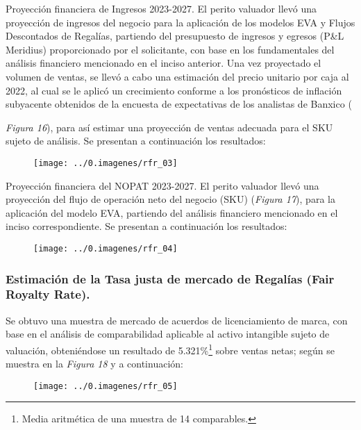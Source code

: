 \begin{leftcolumn}
\textcolor{principal}{Proyección financiera de Ingresos 2023-2027.} El perito valuador llevó  una proyección de ingresos del negocio para la aplicación de los modelos EVA y Flujos Descontados de Regalías, partiendo del presupuesto de ingresos y egresos (P\&L Meridius) proporcionado por el solicitante, con base en los fundamentales del análisis financiero mencionado en el inciso anterior. Una vez proyectado el volumen de ventas, se llevó a cabo una estimación del precio unitario por caja al 2022, al cual se le aplicó un crecimiento conforme a los pronósticos de inflación subyacente obtenidos de la encuesta de expectativas de los analistas de Banxico (\textcolor{principal}{\textit{Figura 16}), para así estimar una proyección de ventas adecuada para el SKU sujeto de análisis.  Se presentan a continuación los resultados:\\

\begin{figure}
\centering
\texttt{[image: ../0.imagenes/rfr\_03]}
\end{figure}

\textcolor{principal}{Proyección financiera del NOPAT 2023-2027.} El perito valuador llevó  una proyección del flujo de operación neto  del negocio (SKU) (\textcolor{principal}{\textit{Figura 17}}), para la aplicación del modelo EVA, partiendo del análisis financiero mencionado en el inciso correspondiente. Se presentan a continuación los resultados:\\

\begin{figure}
\centering
\texttt{[image: ../0.imagenes/rfr\_04]}
\end{figure}

\subsubsection{Estimación de la Tasa justa de mercado de Regalías (Fair Royalty Rate).}

Se obtuvo una muestra de mercado de acuerdos de licenciamiento de marca, con base en el análisis de comparabilidad aplicable al activo intangible sujeto de valuación, obteniéndose un resultado de \textcolor{principal}{5.321\%}\footnote{ Media aritmética de una muestra de 14 comparables.}  sobre \textcolor{principal}{ventas netas}; según se muestra en la \textcolor{principal}{\textit{Figura 18}} y a continuación:

\begin{figure}
\centering
\texttt{[image: ../0.imagenes/rfr\_05]}
\end{figure}

}
\end{leftcolumn}
